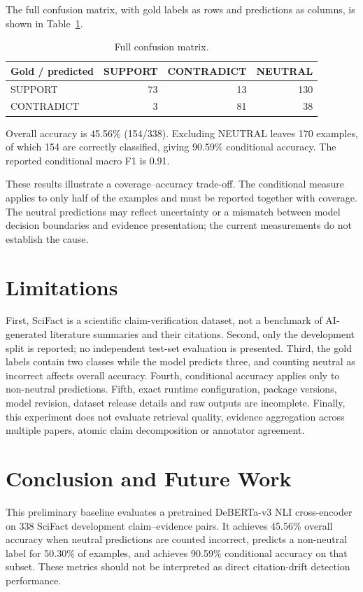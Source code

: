 \documentclass[conference]{IEEEtran}
\begin{document}
The full confusion matrix, with gold labels as rows and predictions as columns, is shown in Table~\ref{tab:cm}.

\begin{table}[t]
\centering
\caption{Full confusion matrix.}
\label{tab:cm}
\begin{tabular}{lrrr}
\toprule
Gold / predicted & SUPPORT & CONTRADICT & NEUTRAL\\
\midrule
SUPPORT & 73 & 13 & 130\\
CONTRADICT & 3 & 81 & 38\\
\bottomrule
\end{tabular}
\end{table}

Overall accuracy is 45.56\% (154/338). Excluding NEUTRAL leaves 170 examples, of which 154 are correctly classified, giving 90.59\% conditional accuracy. The reported conditional macro F1 is 0.91.

These results illustrate a coverage--accuracy trade-off. The conditional measure applies to only half of the examples and must be reported together with coverage. The neutral predictions may reflect uncertainty or a mismatch between model decision boundaries and evidence presentation; the current measurements do not establish the cause.

\section{Limitations}
First, SciFact is a scientific claim-verification dataset, not a benchmark of AI-generated literature summaries and their citations. Second, only the development split is reported; no independent test-set evaluation is presented. Third, the gold labels contain two classes while the model predicts three, and counting neutral as incorrect affects overall accuracy. Fourth, conditional accuracy applies only to non-neutral predictions. Fifth, exact runtime configuration, package versions, model revision, dataset release details and raw outputs are incomplete. Finally, this experiment does not evaluate retrieval quality, evidence aggregation across multiple papers, atomic claim decomposition or annotator agreement.

\section{Conclusion and Future Work}
This preliminary baseline evaluates a pretrained DeBERTa-v3 NLI cross-encoder on 338 SciFact development claim--evidence pairs. It achieves 45.56\% overall accuracy when neutral predictions are counted incorrect, predicts a non-neutral label for 50.30\% of examples, and achieves 90.59\% conditional accuracy on that subset. These metrics should not be interpreted as direct citation-drift detection performance.
\end{document}
